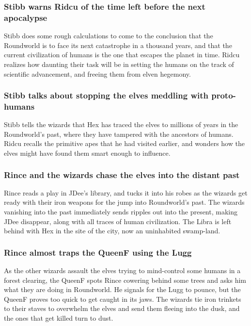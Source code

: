 \subsubsection{\Gls{Stibb} warns \Gls{Ridcu} of the time left before the next apocalypse}
\Gls{Stibb} does some rough calculations to come to the conclusion that the Roundworld is to face
its next catastrophe in a thousand years, and that the current civilization of humans is the one
that escapes the planet in time. \Gls{Ridcu} realizes how daunting their task will be in setting
the humans on the track of scientific advancement, and freeing them from elven hegemony.

\subsubsection{\Gls{Stibb} talks about stopping the elves meddling with proto-humans}
\Gls{Stibb} tells the wizards that \Gls{Hex} has traced the elves to millions of years in the
Roundworld's past, where they have tampered with the ancestors of humans. \Gls{Ridcu} recalls the
primitive apes that he had visited earlier, and wonders how the elves might have found them smart
enough to influence.

\subsubsection{\Gls{Rince} and the wizards chase the elves into the distant past}
\Gls{Rince} reads a play in \Gls{JDee}'s library, and tucks it into his robes as the wizards get
ready with their iron weapons for the jump into Roundworld's past. The wizards vanishing into the
past immediately sends ripples out into the present, making \Gls{JDee} disappear, along with all
traces of human civilization. The \Gls{Libra} is left behind with \Gls{Hex} in the site of the
city, now an uninhabited swamp-land.

\subsubsection{\Gls{Rince} almost traps the \Gls{QueenF} using the \Gls{Lugg}}
As the other wizards assault the elves trying to mind-control some humans in a forest clearing,
the \Gls{QueenF} spots \Gls{Rince} cowering behind some trees and asks him what they are doing in
Roundworld. He signals for the \Gls{Lugg} to pounce, but the \Gls{QueenF} proves too quick to get
caught in its jaws. The wizards tie iron trinkets to their staves to overwhelm the elves and send
them fleeing into the dusk, and the ones that get killed turn to dust.

